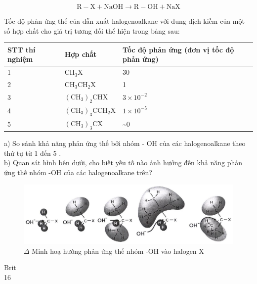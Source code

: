 \documentclass[10pt]{article}
\begin{document}
$$
\mathrm{R}-\mathrm{X}+\mathrm{NaOH} \rightarrow \mathrm{R}-\mathrm{OH}+\mathrm{NaX}
$$

Tốc độ phản ứng thế của dẫn xuất halogenoalkane với dung dịch kiềm của một số hợp chất cho giá trị tương đối thể hiện trong bảng sau:

\begin{center}
\begin{tabular}{|l|l|l|}
\hline
STT thí nghiệm & Hợp chất & Tốc độ phản ứng (đơn vị tốc độ phản ứng) \\
\hline
1 & $\mathrm{CH}_{3} \mathrm{X}$ & 30 \\
\hline
2 & $\mathrm{CH}_{3} \mathrm{CH}_{2} \mathrm{X}$ & 1 \\
\hline
3 & $\left(\mathrm{CH}_{3}\right)_{2} \mathrm{CHX}$ & $3 \times 10^{-2}$ \\
\hline
4 & $\left(\mathrm{CH}_{3}\right)_{3} \mathrm{CCH}_{2} \mathrm{X}$ & $1 \times 10^{-5}$ \\
\hline
5 & $\left(\mathrm{CH}_{3}\right)_{3} \mathrm{CX}$ & \~{}0 \\
\hline
\end{tabular}
\end{center}

a) So sánh khả năng phản ứng thế bởi nhóm - OH của các halogenoalkane theo thứ tự từ 1 đến 5 .\\
b) Quan sát hình bên dưới, cho biết yếu tố nào ảnh hưởng đến khả năng phản ứng thế nhóm -OH của các halogenoalkane trên?

\begin{figure}[h]
\begin{center}
  \includegraphics[width=\textwidth]{2025_10_23_ae7aef68fb3b41082d29g-35}
\captionsetup{labelformat=empty}
\caption{$\Delta$ Minh hoạ hướng phản ứng thế nhóm -OH vào halogen X}
\end{center}
\end{figure}

Brit\\
16
\end{document}
